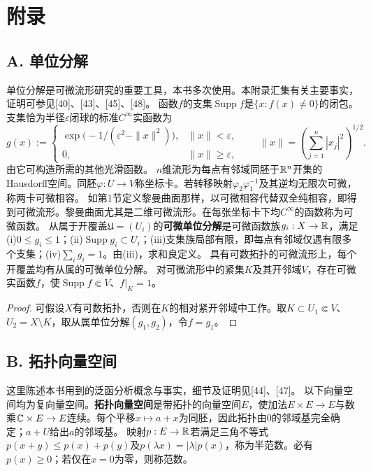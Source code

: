 \chapter*{附录}
\section*{A. 单位分解}
单位分解是可微流形研究的重要工具，本书多次使用。本附录汇集有关主要事实，证明可参见[40]、[43]、[45]、[48]。
函数$f$的支集$\operatorname{Supp}f$是$\{x:f(x)\ne0\}$的闭包。支集恰为半径$\varepsilon$闭球的标准$C^\infty$实函数为
\[
g(x):=\begin{cases}\exp\bigl(-1/(\varepsilon^2-\|x\|^2)\bigr),&\|x\|<\varepsilon,\\0,&\|x\|\ge\varepsilon,\end{cases}
\qquad\|x\|=\left(\sum_{j=1}^n|x_j|^2\right)^{1/2}.
\]
由它可构造所需的其他光滑函数。
$n$维流形为每点有邻域同胚于$\mathbb R^n$开集的Hausdorff空间。同胚$\varphi:U\to V$称坐标卡。若转移映射$\varphi_2\varphi_1^{-1}$及其逆均无限次可微，称两卡可微相容。
如第1节定义黎曼曲面那样，以可微相容代替双全纯相容，即得到可微流形。黎曼曲面尤其是二维可微流形。在每张坐标卡下均$C^\infty$的函数称为可微函数。
从属于开覆盖$\mathfrak U=(U_i)$的\textbf{可微单位分解}是可微函数族$g_i:X\to\mathbb R$，满足(i)$0\le g_i\le1$；(ii)$\operatorname{Supp}g_i\subset U_i$；(iii)支集族局部有限，即每点有邻域仅遇有限多个支集；(iv)$\sum_ig_i=1$。由(iii)，求和良定义。
具有可数拓扑的可微流形上，每个开覆盖均有从属的可微单位分解。
对可微流形中的紧集$K$及其开邻域$V$，存在可微实函数$f$，使$\operatorname{Supp}f\Subset V$、$f|_K=1$。
\begin{proof}
可假设$X$有可数拓扑，否则在$K$的相对紧开邻域中工作。取$K\subset U_1\Subset V$、$U_2=X\setminus K$，取从属单位分解$(g_1,g_2)$，令$f=g_1$。
\end{proof}
\section*{B. 拓扑向量空间}
这里陈述本书用到的泛函分析概念与事实，细节及证明见[44]、[47]。
以下向量空间均为复向量空间。\textbf{拓扑向量空间}是带拓扑的向量空间$E$，使加法$E\times E\to E$与数乘$\mathbb C\times E\to E$连续。每个平移$x\mapsto a+x$为同胚，因此拓扑由0的邻域基完全确定；$a+U$给出$a$的邻域基。
映射$p:E\to\mathbb R$若满足三角不等式$p(x+y)\le p(x)+p(y)$及$p(\lambda x)=|\lambda|p(x)$，称为半范数。必有$p(x)\ge0$；若仅在$x=0$为零，则称范数。

